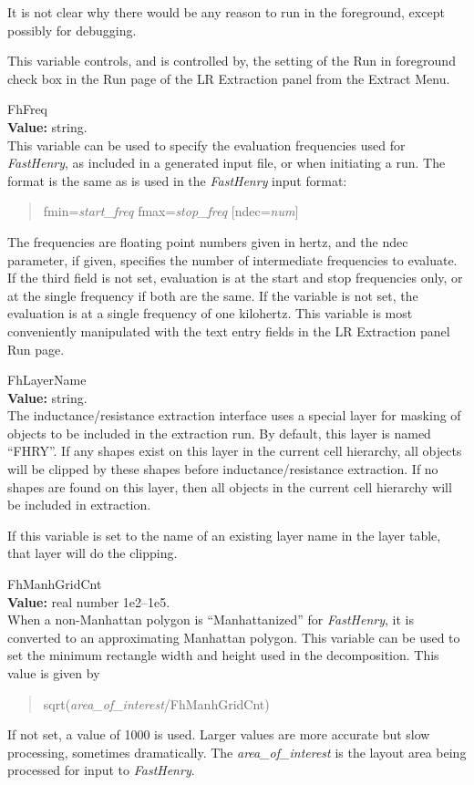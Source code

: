 \begin{description}
It is not clear why there would be any reason to run in the
foreground, except possibly for debugging.

This variable controls, and is controlled by, the setting of the {\cb
Run in foreground} check box in the {\cb Run} page of the {\cb LR
Extraction} panel from the {\cb Extract Menu}.

\item{\et FhFreq}\\
{\bf Value:} string.\\
This variable can be used to specify the evaluation frequencies used
for {\it FastHenry}, as included in a generated input file, or when
initiating a run.  The format is the same as is used in the {\it
FastHenry} input format:
\begin{quote}
{\vt fmin=}{\it start\_freq} {\vt fmax=}{\it stop\_freq}
     [{\vt ndec=}{\it num\/}]
\end{quote}
The frequencies are floating point numbers given in hertz, and the
{\vt ndec} parameter, if given, specifies the number of intermediate
frequencies to evaluate.  If the third field is not set, evaluation is
at the start and stop frequencies only, or at the single frequency if
both are the same.  If the variable is not set, the evaluation is at a
single frequency of one kilohertz.  This variable is most conveniently
manipulated with the text entry fields in the {\cb LR Extraction}
panel {\cb Run} page.

\item{\et FhLayerName}\\
{\bf Value:} string.\\
The inductance/resistance extraction interface uses a special layer
for masking of objects to be included in the extraction run.  By
default, this layer is named ``{\vt FHRY}''.  If any shapes exist on
this layer in the current cell hierarchy, all objects will be clipped
by these shapes before inductance/resistance extraction.  If no shapes
are found on this layer, then all objects in the current cell
hierarchy will be included in extraction.

If this variable is set to the name of an existing layer name in the
layer table, that layer will do the clipping.

\item{\et FhManhGridCnt}\\
{\bf Value:} real number 1e2--1e5.\\
When a non-Manhattan polygon is ``Manhattanized'' for {\it FastHenry},
it is converted to an approximating Manhattan polygon.  This variable
can be used to set the minimum rectangle width and height used in the
decomposition.  This value is given by
\begin{quote}
{\vt sqrt(}{\it area\_of\_interest\/}{\vt /FhManhGridCnt)}
\end{quote}
If not set, a value of 1000 is used.  Larger values are more accurate
but slow processing, sometimes dramatically.  The {\it
area\_of\_interest} is the layout area being processed for input to
{\it FastHenry}.


\end{description}
